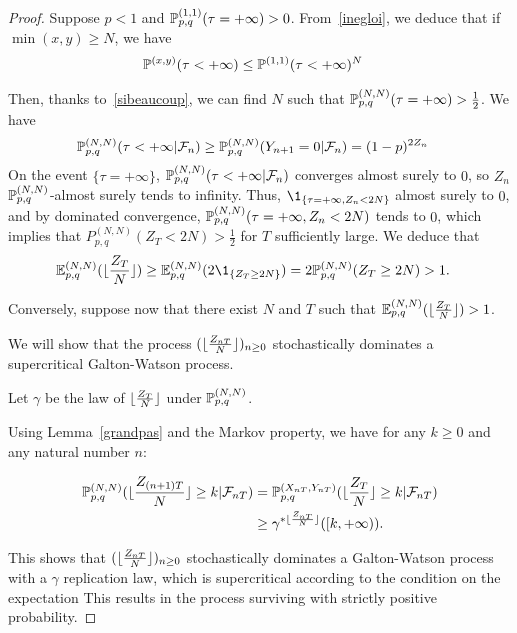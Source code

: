 \begin{proof}
  Suppose $p<1$ and $\P_{p,q}^{(1,1)}(\tau=+\infty)>0$.
From~\eqref{inegloi}, we deduce
that if $\min(x,y)\ge N$, we have
\begin{align}
  \label{sibeaucoup}
  \P^{(x,y)}(\tau<+\infty)&\le \P^{(1,1)}(\tau<+\infty)^N
\end{align}
  
  Then, thanks to~\eqref{sibeaucoup}, we can find $N$ such that $\P_{p,q}^{(N,N)}(\tau=+\infty)>\frac12$.
  We have
  \begin{align*}
    \P_{p,q}^{(N,N)}(\tau<+\infty|\mathcal{F}_n)&\ge \P_{p,q}^{(N,N)}(Y_{n+1}=0|\mathcal{F}_n)=(1-p)^{2Z_n}
  \end{align*}
  On the event $\{\tau=+\infty\}$, $\P_{p,q}^{(N,N)}(\tau<+\infty|\mathcal{F}_n)$ converges almost surely to $0$, so $Z_n$ $\P_{p,q}^{(N,N)}$-almost surely tends to infinity. Thus, $\1_{\{\tau=+\infty,Z_n<2N\}}$ almost surely to $0$, and by dominated convergence, $\P_{p,q}^{(N,N)}(\tau=+\infty,Z_n<2N)$ tends to $0$, which implies
  that $P_{p,q}^{(N,N)}(Z_T<2N)>\frac12$ for $T$ sufficiently large.
We deduce that 
\begin{align*}
    \E^{(N,N)}_{p,q}(\floor{\frac{Z_{T}}{N}})&\ge \E^{(N,N)}_{p,q}(2\1_{\{Z_T\ge 2N\}})=2\P^{(N,N)}_{p,q}(Z_T\ge 2N)>1.
\end{align*}

Conversely, suppose now that there exist $N$ and $T$ such that
$\E^{(N,N)}_{p,q}(\floor{\frac{Z_{T}}{N}})>1$.

We will show that the process $(\floor{\frac{Z_{nT}}{N}})_{n\ge 0}$ stochastically dominates a supercritical Galton-Watson process.

Let $\gamma$ be the law of $\floor{\frac{Z_{T}}{N}}$ under $\P_{p,q}^{(N,N)}$.

Using Lemma~\ref{grandpas} and the Markov property, we have for any $k\ge 0$ and any natural number $n$:

  \begin{align*}
    \P_{p,q}^{(N,N)}(\floor{\frac{Z_{(n+1)T}}{N}}\ge k|\mathcal{F}_{nT})&= \P_{p,q}^{(X_{nT},Y_{nT})}(\floor{\frac{Z_{T}}{N}}\ge k|\mathcal{F}_{nT})\\ &\ge \gamma^{* \floor{\frac{Z_{nT}}{N}} }([k,+\infty)).
  \end{align*}  

  This shows that $(\floor{\frac{Z_{nT}}{N}})_{n\ge 0}$ stochastically dominates a Galton-Watson process with a $\gamma$ replication law, which is supercritical according to the condition on the expectation
 This results in the process surviving with strictly positive probability. 
\end{proof}  

